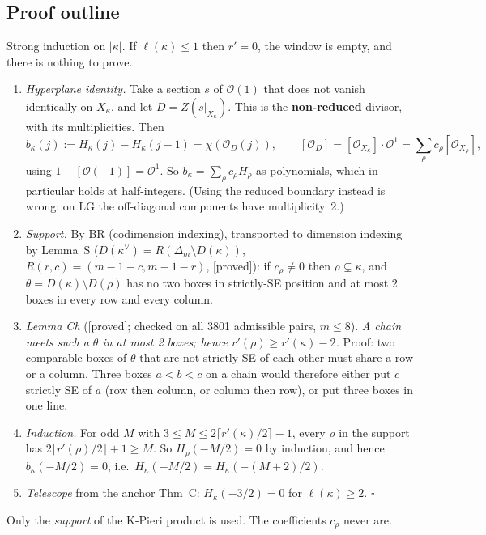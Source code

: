 \documentclass[10pt]{amsart}
\newcommand{\grade}[1]{\textsf{[#1]}}
\newcommand{\LG}{\mathrm{LG}}
\begin{document}
\subsection*{Proof outline} Strong induction on $|\kappa|$. If $\ell(\kappa)\le1$ then $r'=0$, the window is empty, and there
is nothing to prove.
\begin{enumerate}[label=\arabic*.]
\item \emph{Hyperplane identity.} Take a section $s$ of $\mathcal O(1)$ that does not vanish identically on $X_\kappa$, and let
$D=Z(s|_{X_\kappa})$. This is the \textbf{non-reduced} divisor, with its multiplicities. Then
\[ b_\kappa(j):=H_\kappa(j)-H_\kappa(j-1)=\chi(\mathcal O_D(j)),\qquad [\mathcal O_D]=[\mathcal O_{X_\kappa}]\cdot\mathcal O^1
=\sum_\rho c_\rho[\mathcal O_{X_\rho}], \]
using $1-[\mathcal O(-1)]=\mathcal O^1$. So $b_\kappa=\sum_\rho c_\rho H_\rho$ as polynomials, which in particular holds at
half-integers. (Using the reduced boundary instead is wrong: on $\LG$ the off-diagonal components have multiplicity~2.)
\item \emph{Support.} By BR (codimension indexing), transported to dimension indexing by Lemma~S
($D(\kappa^\vee)=R(\Delta_m\setminus D(\kappa))$, $R(r,c)=(m-1-c,m-1-r)$, \grade{proved}): if $c_\rho\neq0$ then
$\rho\subsetneq\kappa$, and $\theta=D(\kappa)\setminus D(\rho)$ has no two boxes in strictly-SE position and at most 2 boxes
in every row and every column.
\item \emph{Lemma Ch} (\grade{proved}; checked on all 3801 admissible pairs, $m\le8$). \emph{A chain meets such a $\theta$ in at
most 2 boxes; hence $r'(\rho)\ge r'(\kappa)-2$.} Proof: two comparable boxes of $\theta$ that are not strictly SE of each other
must share a row or a column. Three boxes $a<b<c$ on a chain would therefore either put $c$ strictly SE of $a$ (row then
column, or column then row), or put three boxes in one line.
\item \emph{Induction.} For odd $M$ with $3\le M\le2\lceil r'(\kappa)/2\rceil-1$, every $\rho$ in the support has
$2\lceil r'(\rho)/2\rceil+1\ge M$. So $H_\rho(-M/2)=0$ by induction, and hence $b_\kappa(-M/2)=0$, i.e.\
$H_\kappa(-M/2)=H_\kappa(-(M+2)/2)$.
\item \emph{Telescope} from the anchor Thm~C: $H_\kappa(-3/2)=0$ for $\ell(\kappa)\ge2$. \hfill$\square$
\end{enumerate}
Only the \emph{support} of the K-Pieri product is used. The coefficients $c_\rho$ never are.
\end{document}
